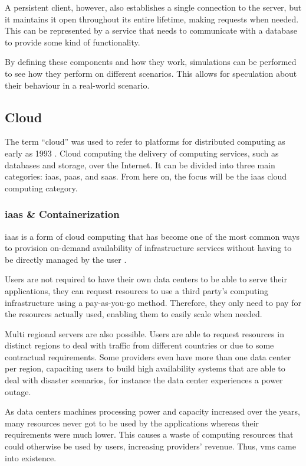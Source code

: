 A persistent client, however, also establishes a single connection to the server, but it maintains it open throughout its entire lifetime, making requests when needed. This can be represented by a service that needs to communicate with a database to provide some kind of functionality.

By defining these components and how they work, simulations can be performed to see how they perform on different scenarios. This allows for speculation about their behaviour in a real-world scenario.

\subsection{Cloud}

The term “cloud” was used to refer to platforms for distributed computing as early as 1993 \cite{what_is_cloud}. Cloud computing the delivery of computing services, such as databases and storage, over the Internet. It can be divided into three main categories: \gls{iaas}, \gls{paas}, and \gls{saas}. From here on, the focus will be the \gls{iaas} cloud computing category.

\subsubsection{\gls{iaas} \& Containerization}

\gls{iaas} is a form of cloud computing that has become one of the most common ways to provision on-demand availability of infrastructure services without having to be directly managed by the user \cite{what_is_cloud}.

Users are not required to have their own data centers to be able to serve their applications, they can request resources to use a third party’s computing infrastructure using a pay-as-you-go method. Therefore, they only need to pay for the resources actually used, enabling them to easily scale when needed.

Multi regional servers are also possible. Users are able to request resources in distinct regions to deal with traffic from different countries or due to some contractual requirements. Some providers even have more than one data center per region, capaciting users to build high availability systems that are able to deal with disaster scenarios, for instance the data center experiences a power outage.

As data centers machines processing power and capacity increased over the years, many resources never got to be used by the applications whereas their requirements were much lower. This causes a waste of computing resources that could otherwise be used by users, increasing providers’ revenue. Thus, \glspl{vm} came into existence. 

